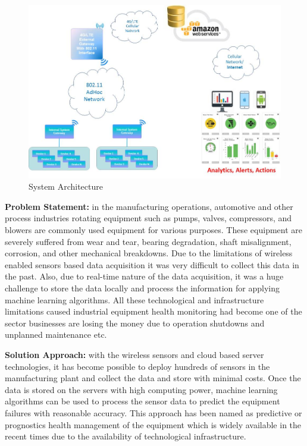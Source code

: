 \documentclass[sigconf]{acmart}
\begin{document}
\begin{figure}
\includegraphics[width=1.0\columnwidth]{images/system_architecture}
\caption{System Architecture} \label{fig:Figure1}
\end{figure}


\textbf{Problem Statement:} in the manufacturing operations, automotive and other process industries rotating equipment such as pumps, valves, compressors, and blowers are commonly used equipment for various purposes. These equipment are severely suffered from wear and tear, bearing degradation, shaft misalignment, corrosion, and other mechanical breakdowns. Due to the limitations of wireless enabled sensors based data acquisition it was very difficult to collect this data in the past. Also, due to real-time nature of the data acquisition, it was a huge challenge to store the data locally and process the information for applying machine learning algorithms. All these technological and infrastructure limitations caused industrial equipment health monitoring had become one of the sector businesses are losing the money due to operation shutdowns and unplanned maintenance etc.

\textbf{Solution Approach:} with the wireless sensors and cloud based server technologies, it has become possible to deploy hundreds of sensors in the manufacturing plant and collect the data and store with minimal costs. Once the data is stored on the servers with high computing power, machine learning algorithms can be used to process the sensor data to predict the equipment failures with reasonable accuracy. This approach has been named as predictive or prognostics health management of the equipment which is widely available in the recent times due to the availability of technological infrastructure.
\end{document}
